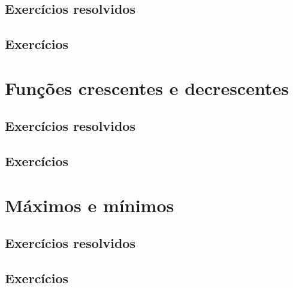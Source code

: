 \subsection*{Exercícios resolvidos}

\construirExeresol


\subsection*{Exercícios}

\construirExer


\section{Funções crescentes e decrescentes}
\construirSec

\subsection*{Exercícios resolvidos}

\construirExeresol


\subsection*{Exercícios}

\construirExer


\section{Máximos e mínimos}
\construirSec

\subsection*{Exercícios resolvidos}

\construirExeresol


\subsection*{Exercícios}

\construirExer



